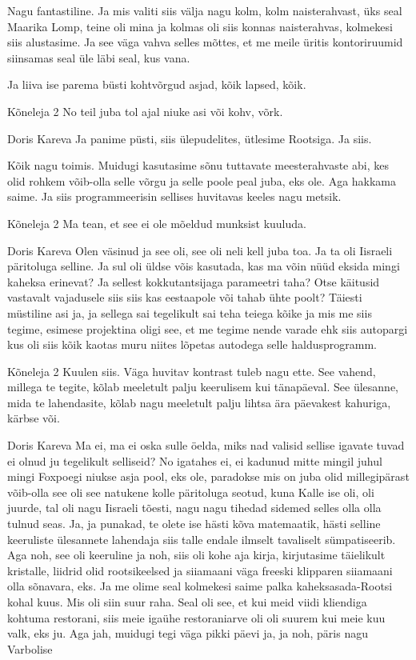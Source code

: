 Nagu fantastiline. Ja mis valiti siis välja nagu kolm, kolm naisterahvast, üks seal Maarika Lomp, teine oli mina ja kolmas oli siis konnas naisterahvas, kolmekesi siis alustasime. Ja see väga vahva selles mõttes, et me meile üritis kontoriruumid siinsamas seal üle läbi seal, kus vana. 

Ja liiva ise parema büsti kohtvõrgud asjad, kõik lapsed, kõik. 

Kõneleja 2
No teil juba tol ajal niuke asi või kohv, võrk. 

Doris Kareva
Ja panime püsti, siis ülepudelites, ütlesime Rootsiga. Ja siis. 

Kõik nagu toimis. Muidugi kasutasime sõnu tuttavate meesterahvaste abi, kes olid rohkem võib-olla selle võrgu ja selle poole peal juba, eks ole. Aga hakkama saime. Ja siis programmeerisin sellises huvitavas keeles nagu metsik. 

Kõneleja 2
Ma tean, et see ei ole mõeldud munksist kuuluda. 

Doris Kareva
Olen väsinud ja see oli, see oli neli kell juba toa. Ja ta oli Iisraeli päritoluga selline. Ja sul oli üldse võis kasutada, kas ma võin nüüd eksida mingi kaheksa erinevat? Ja sellest kokkutantsijaga parameetri taha? Otse käitusid vastavalt vajadusele siis siis kas eestaapole või tahab ühte poolt? Täiesti müstiline asi ja, ja sellega sai tegelikult sai teha teiega kõike ja mis me siis tegime, esimese projektina oligi see, et me tegime nende varade ehk siis autopargi kus oli siis kõik kaotas muru niites lõpetas autodega selle haldusprogramm. 

Kõneleja 2
Kuulen siis. Väga huvitav kontrast tuleb nagu ette. See vahend, millega te tegite, kõlab meeletult palju keerulisem kui tänapäeval. See ülesanne, mida te lahendasite, kõlab nagu meeletult palju lihtsa ära päevakest kahuriga, kärbse või. 

Doris Kareva
Ma ei, ma ei oska sulle öelda, miks nad valisid sellise igavate tuvad ei olnud ju tegelikult selliseid? No igatahes ei, ei kadunud mitte mingil juhul mingi Foxpoegi niukse asja pool, eks ole, paradokse mis on juba olid millegipärast võib-olla see oli see natukene kolle päritoluga seotud, kuna Kalle ise oli, oli juurde, tal oli nagu Iisraeli tõesti, nagu nagu tihedad sidemed selles olla olla tulnud seas. Ja, ja punakad, te olete ise hästi kõva matemaatik, hästi selline keeruliste ülesannete lahendaja siis talle endale ilmselt tavaliselt sümpatiseerib. Aga noh, see oli keeruline ja noh, siis oli kohe aja kirja, kirjutasime täielikult kristalle, liidrid olid rootsikeelsed ja siiamaani väga freeski klipparen siiamaani olla sõnavara, eks. Ja me olime seal kolmekesi saime palka kaheksasada-Rootsi kohal kuus. Mis oli siin suur raha. Seal oli see, et kui meid viidi kliendiga kohtuma restorani, siis meie igaühe restoraniarve oli oli suurem kui meie kuu valk, eks ju. Aga jah, muidugi tegi väga pikki päevi ja, ja noh, päris nagu Varbolise 

